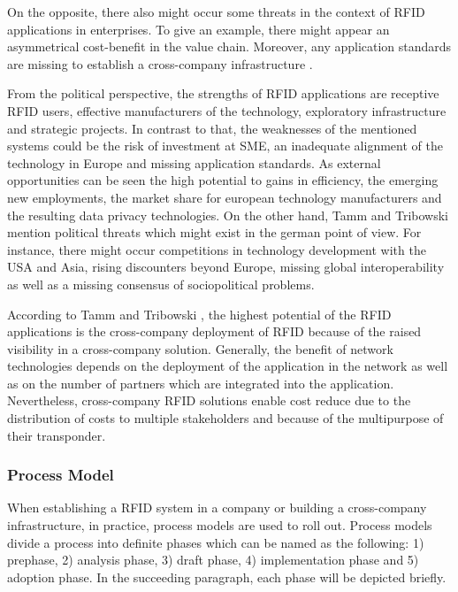 On the opposite, there also might occur some threats in the context of RFID applications in enterprises. To give an example, there might appear an asymmetrical cost-benefit in the value chain. Moreover, any application standards are missing to establish a cross-company infrastructure \cite[p.47 ff.]{fokus}.

From the political perspective, the strengths of RFID applications are receptive RFID users, effective manufacturers of the technology, exploratory infrastructure and strategic projects. In contrast to that, the weaknesses of the mentioned systems could be the risk of investment at \ac{SME}, an inadequate alignment of the technology in Europe and missing application standards. As external opportunities can be seen the high potential to gains in efficiency, the emerging new employments, the market share for european technology manufacturers and the resulting data privacy technologies. On the other hand,  Tamm and Tribowski \cite[p.47 ff.]{fokus} mention political threats which might exist in the german point of view. For instance, there might occur competitions in technology development with the USA and Asia, rising discounters beyond Europe, missing global interoperability as well as a missing consensus of sociopolitical problems. 

According to Tamm and Tribowski \cite[p.95 ff.]{fokus}, the highest potential of the RFID applications is the cross-company deployment of RFID because of the raised visibility in a cross-company solution. Generally, the benefit of network technologies depends on the deployment of the application in the network as well as on the number of partners which are integrated into the application. Nevertheless, cross-company RFID solutions enable cost reduce due to the distribution of costs to multiple stakeholders and because of the multipurpose of their transponder.

\subsubsection{Process Model}

When establishing a RFID system in a company or building a cross-company infrastructure, in practice, process models are used to roll out. Process models divide a process into definite phases \cite[p.59 ff.]{fokus} which can be named as the following: 1) prephase, 2) analysis phase, 3) draft phase, 4) implementation phase and 5) adoption phase. In the succeeding paragraph, each phase will be depicted briefly.

